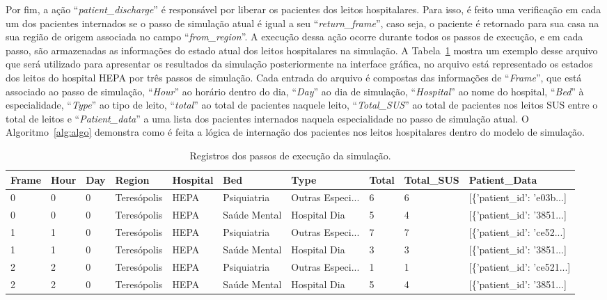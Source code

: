 Por fim, a ação ``\textit{patient\_discharge}'' é responsável por liberar os pacientes dos leitos hospitalares. Para isso, é feito uma verificação em cada um dos pacientes internados se o passo de simulação atual é igual a seu ``\textit{return\_frame}'', caso seja, o paciente é retornado para sua casa na sua região de origem associada no campo ``\textit{from\_region}''. A execução dessa ação ocorre durante todos os passos de execução, e em cada passo, são armazenadas as informações do estado atual dos leitos hospitalares na simulação. A Tabela~\ref{table:passos} mostra um exemplo desse arquivo que será utilizado para apresentar os resultados da simulação posteriormente na interface gráfica, no arquivo está representado os estados dos leitos do hospital HEPA por três passos de simulação. Cada entrada do arquivo é compostas das informações de ``\textit{Frame}'', que está associado ao passo de simulação, ``\textit{Hour}'' ao horário dentro do dia, ``\textit{Day}'' ao dia de simulação, ``\textit{Hospital}'' ao nome do hospital, ``\textit{Bed}'' à especialidade, ``\textit{Type}'' ao tipo de leito, ``\textit{total}'' ao total de pacientes naquele leito, ``\textit{Total\_SUS}'' ao total de pacientes nos leitos SUS entre o total de leitos e ``\textit{Patient\_data}'' a uma lista dos pacientes internados naquela especialidade no passo de simulação atual. O Algoritmo~\ref{alg:algo} demonstra como é feita a lógica de internação dos pacientes nos leitos hospitalares dentro do modelo de simulação.

\begin{table}[!ht]
    \centering
    \begin{tabular}{p{}p{}p{}p{}p{}p{}p{}p{}p{}p{}}
        Frame & Hour & Day & Region & Hospital & Bed & Type & Total & Total\_SUS & Patient\_Data \\ \hline
        0 & 0 & 0 & Teresópolis & HEPA & Psiquiatria & Outras Especi... & 6 & 6 & [\{'patient\_id': 'e03b...]\\
        0 & 0 & 0 & Teresópolis & HEPA & Saúde Mental & Hospital Dia & 5 & 4 & [\{'patient\_id': '3851...]\\
        1 & 1 & 0 & Teresópolis & HEPA & Psiquiatria & Outras Especi... & 7 & 7 & [\{'patient\_id': 'ce52...]\\
        1 & 1 & 0 & Teresópolis & HEPA & Saúde Mental & Hospital Dia & 3 & 3 & [\{'patient\_id': '3851...]\\
        2 & 2 & 0 & Teresópolis & HEPA & Psiquiatria & Outras Especi... & 1 & 1 & [\{'patient\_id': 'ce521...]\\
        2 & 2 & 0 & Teresópolis & HEPA & Saúde Mental & Hospital Dia & 5 & 4 & [\{'patient\_id': '3851...]\\
    \end{tabular}
    \caption{Registros dos passos de execução da simulação.}
    \label{table:passos}
\end{table}

